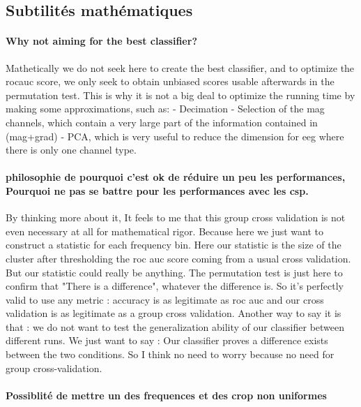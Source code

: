 \subsection{Subtilités mathématiques}

\paragraph{Why not aiming for the best classifier?}
Mathetically we do not seek here to create the best classifier,
and to optimize the rocauc score, we only seek
to obtain unbiased scores usable afterwards in the permutation test.
This is why it is not a big deal to optimize the running time
by making some approximations, such as:
- Decimation
- Selection of the mag channels, which contain a very large part of
the information contained in (mag+grad)
- PCA, which is very useful to reduce the dimension for eeg
where there is only one channel type.


\paragraph{philosophie de pourquoi c'est ok de réduire un peu les performances, Pourquoi ne pas se battre pour les performances avec les csp.}

By thinking more about it, It feels to me that this group cross validation is not even necessary at all for mathematical rigor. Because here we just want to construct a statistic for each frequency bin. Here our statistic is the size of the cluster after thresholding the roc auc score coming from a usual cross validation. But our statistic could really be anything. The permutation test is just here to confirm that "There is a difference", whatever the difference is. So it's perfectly valid to use any metric : accuracy is as legitimate as roc auc and our cross validation is as legitimate as a group cross validation.
Another way to say it is that : we do not want to test the generalization ability of our classifier between different runs. We just want to say : Our classifier proves a difference exists between the two conditions.
So I think no need to worry because no need for group cross-validation.


\paragraph{Possiblité de mettre un des frequences et des crop non uniformes}




